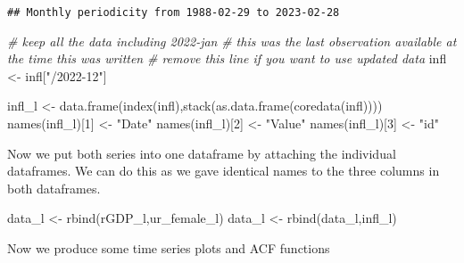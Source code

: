 \documentclass[
]{article}
\newenvironment{Shaded}{\begin{snugshade}}{\end{snugshade}}
\newcommand{\CommentTok}[1]{\textcolor[rgb]{0.56,0.35,0.01}{\textit{#1}}}
\newcommand{\DecValTok}[1]{\textcolor[rgb]{0.00,0.00,0.81}{#1}}
\newcommand{\FunctionTok}[1]{\textcolor[rgb]{0.00,0.00,0.00}{#1}}
\newcommand{\NormalTok}[1]{#1}
\newcommand{\OtherTok}[1]{\textcolor[rgb]{0.56,0.35,0.01}{#1}}
\newcommand{\StringTok}[1]{\textcolor[rgb]{0.31,0.60,0.02}{#1}}
\begin{document}
\begin{verbatim}
## Monthly periodicity from 1988-02-29 to 2023-02-28
\end{verbatim}

\begin{Shaded}
\begin{Highlighting}[]
\CommentTok{\# keep all the data including 2022{-}jan}
\CommentTok{\# this was the last observation available at the time this was written}
\CommentTok{\# remove this line if you want to use updated data}
\NormalTok{infl }\OtherTok{\textless{}{-}}\NormalTok{ infl[}\StringTok{"/2022{-}12"}\NormalTok{]  }

\NormalTok{infl\_l }\OtherTok{\textless{}{-}} \FunctionTok{data.frame}\NormalTok{(}\FunctionTok{index}\NormalTok{(infl),}\FunctionTok{stack}\NormalTok{(}\FunctionTok{as.data.frame}\NormalTok{(}\FunctionTok{coredata}\NormalTok{(infl))))}
\FunctionTok{names}\NormalTok{(infl\_l)[}\DecValTok{1}\NormalTok{] }\OtherTok{\textless{}{-}} \StringTok{"Date"}
\FunctionTok{names}\NormalTok{(infl\_l)[}\DecValTok{2}\NormalTok{] }\OtherTok{\textless{}{-}} \StringTok{"Value"}
\FunctionTok{names}\NormalTok{(infl\_l)[}\DecValTok{3}\NormalTok{] }\OtherTok{\textless{}{-}} \StringTok{"id"}
\end{Highlighting}
\end{Shaded}

Now we put both series into one dataframe by attaching the individual
dataframes. We can do this as we gave identical names to the three
columns in both dataframes.

\begin{Shaded}
\begin{Highlighting}[]
\NormalTok{data\_l }\OtherTok{\textless{}{-}} \FunctionTok{rbind}\NormalTok{(rGDP\_l,ur\_female\_l)}
\NormalTok{data\_l }\OtherTok{\textless{}{-}} \FunctionTok{rbind}\NormalTok{(data\_l,infl\_l)}
\end{Highlighting}
\end{Shaded}

Now we produce some time series plots and ACF functions
\end{document}
